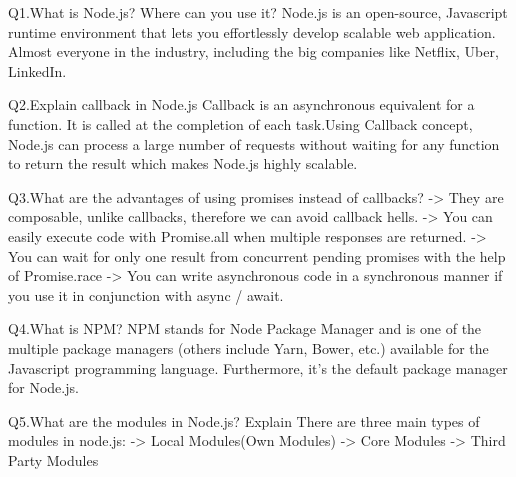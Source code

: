 Q1.What is Node.js? Where can you use it?
   Node.js is an open-source, Javascript runtime environment that lets
you effortlessly develop scalable web application.
   Almost everyone in the industry, including the big companies like 
Netflix, Uber, LinkedIn.


Q2.Explain callback in Node.js
   Callback is an asynchronous equivalent for a function. It is called
at the completion of each task.Using Callback concept, Node.js can 
process a large number of requests without waiting for any function to
return the result which makes Node.js highly scalable.


Q3.What are the advantages of using promises instead of callbacks?
   -> They are composable, unlike callbacks, therefore we can avoid 
      callback hells.
   -> You can easily execute code with Promise.all when multiple 
      responses are returned.
   -> You can wait for only one result from concurrent pending promises
      with the help of Promise.race
   -> You can write asynchronous code in a synchronous manner if you
      use it in conjunction with async / await.


Q4.What is NPM?
   NPM stands for Node Package Manager and is one of the multiple 
package managers (others include Yarn, Bower, etc.) available for the 
Javascript programming language. Furthermore, it’s the default package
manager for Node.js.


Q5.What are the modules in Node.js? Explain
   There are three main types of modules in node.js:
    -> Local Modules(Own Modules)
    -> Core Modules
    -> Third Party Modules
